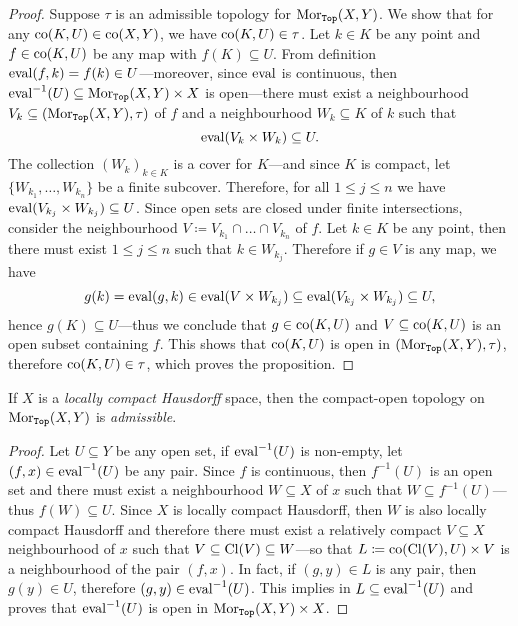 \begin{proof}
    Suppose \(\tau\) is an admissible topology for \(\operatorname{Mor}_{{\texttt{Top}}}(X, Y)\). We show
    that for any \(\operatorname{co}(K, U) \in \operatorname{co}(X, Y)\), we have \(\operatorname{co}(K, U) \in \tau\). Let
    \(k \in K\) be any point and \(f \in \operatorname{co}(K, U)\) be any map with
    \(f(K) \subseteq U\). From definition \(\operatorname{eval}(f, k) = f(k) \in U\)---moreover,
    since \(\operatorname{eval}\) is continuous, then
    \(\operatorname{eval}^{-1}(U) \subseteq \operatorname{Mor}_{{\texttt{Top}}}(X, Y) \times X\) is open---there must
    exist a neighbourhood \(V_k \subseteq (\operatorname{Mor}_{{\texttt{Top}}}(X, Y), \tau)\) of \(f\) and a
    neighbourhood \(W_k \subseteq K\) of \(k\) such that
    \[
        \operatorname{eval}(V_k \times W_k) \subseteq U.
    \]
    The collection \((W_k)_{k \in K}\) is a cover for \(K\)---and since \(K\) is
    compact, let \(\{W_{k_1}, \dots, W_{k_n}\}\) be a finite subcover. Therefore,
    for all \(1 \leq j \leq n\) we have
    \(\operatorname{eval}(V_{k_j} \times W_{k_j}) \subseteq U\). Since open sets are closed under
    finite intersections, consider the neighbourhood
    \(V \coloneq V_{k_1} \cap \dots \cap V_{k_n}\) of \(f\). Let
    \(k \in K\) be any point, then there must exist \(1 \leq j \leq n\) such that
    \(k \in W_{k_j}\). Therefore if \(g \in V\) is any map, we have
    \[
        g(k) = \operatorname{eval}(g, k) \in \operatorname{eval}(V \times W_{k_j}) \subseteq
        \operatorname{eval}(V_{k_j} \times W_{k_j}) \subseteq U,
    \]
    hence \(g(K) \subseteq U\)---thus we conclude that \(g \in \operatorname{co}(K, U)\) and \(V
    \subseteq \operatorname{co}(K, U)\) is an open subset containing \(f\). This shows that
    \(\operatorname{co}(K, U)\) is open in \((\operatorname{Mor}_{{\texttt{Top}}}(X, Y), \tau)\), therefore \(\operatorname{co}(K, U)
    \in \tau\), which proves the proposition.
\end{proof}

\begin{proposition}
    \label{prop:cpct-open-is-admissible}
    If \(X\) is a \emph{locally compact Hausdorff} space, then the compact-open
    topology on \(\operatorname{Mor}_{{\texttt{Top}}}(X, Y)\) is \emph{admissible}.
\end{proposition}

\begin{proof}
    Let \(U \subseteq Y\) be any open set, if \(\operatorname{eval}^{-1}(U)\) is non-empty, let
    \((f, x) \in \operatorname{eval}^{-1}(U)\) be any pair. Since \(f\) is continuous, then
    \(f^{-1}(U)\) is an open set and there must exist a neighbourhood
    \(W \subseteq X\) of \(x\) such that \(W \subseteq f^{-1}(U)\)---thus
    \(f(W) \subseteq U\). Since \(X\) is locally compact Hausdorff, then \(W\) is
    also locally compact Hausdorff and therefore there must exist a relatively
    compact \(V \subseteq X\) neighbourhood of \(x\) such that
    \(V \subseteq \operatorname{Cl}(V) \subseteq W\)---so that
    \(L \coloneq \operatorname{co}(\operatorname{Cl}(V), U) \times V\) is a neighbourhood of the pair
    \((f, x)\). In fact, if \((g, y) \in L\) is any pair, then \(g(y) \in U\),
    therefore \((g, y) \in \operatorname{eval}^{-1}(U)\). This implies in
    \(L \subseteq \operatorname{eval}^{-1}(U)\) and proves that \(\operatorname{eval}^{-1}(U)\) is open in
    \(\operatorname{Mor}_{{\texttt{Top}}}(X, Y) \times X\).
\end{proof}


